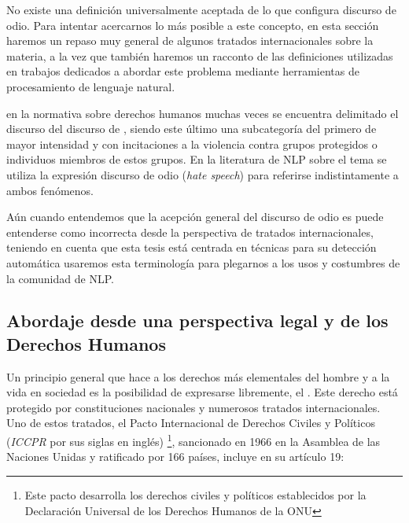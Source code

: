 No existe una definición universalmente aceptada de lo que configura discurso de odio. Para intentar acercarnos lo más posible a este concepto, en esta sección haremos un repaso muy general de algunos tratados internacionales sobre la materia, a la vez que también haremos un racconto de las definiciones utilizadas en trabajos dedicados a abordar este problema mediante herramientas de procesamiento de lenguaje natural.

 en la normativa sobre derechos humanos muchas veces se encuentra delimitado el discurso  del discurso de , siendo este último una subcategoría del primero de mayor intensidad y con incitaciones a la violencia contra grupos protegidos o individuos miembros de estos grupos. En la literatura de NLP sobre el tema se utiliza la expresión discurso de odio (\emph{hate speech}) para referirse indistintamente a ambos fenómenos.

Aún cuando entendemos que la acepción general del discurso de odio es puede entenderse como incorrecta desde la perspectiva de tratados internacionales, teniendo en cuenta que esta tesis está centrada en técnicas para su detección automática usaremos esta terminología para plegarnos a los usos y costumbres de la comunidad de NLP.

\subsection{Abordaje desde una perspectiva legal y de los Derechos Humanos}

Un principio general que hace a los derechos más elementales del hombre y a la vida en sociedad es la posibilidad de expresarse libremente, el . Este derecho está protegido por constituciones nacionales y numerosos tratados internacionales. Uno de estos tratados, el Pacto Internacional de Derechos Civiles y Políticos (\emph{ICCPR} por sus siglas en inglés) \footnote{Este pacto desarrolla los derechos civiles y políticos establecidos por la Declaración Universal de los Derechos Humanos de la ONU}, sancionado en 1966 en la Asamblea de las Naciones Unidas y ratificado por 166 países, incluye en su artículo 19:

